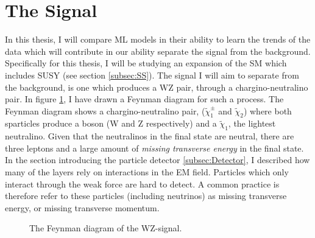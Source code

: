 \section{The Signal}\label{sec:signal}
In this thesis, I will compare \ac{ML} models in their ability to learn the trends of the data which will contribute  
in our ability separate the signal from the background. Specifically for this thesis, I will be studying an expansion of the 
\ac{SM} which includes \ac{SUSY} (see section \ref{subsec:SS}). The signal I will aim to separate from the background, is one 
which produces a WZ pair, through a chargino-neutralino pair. In figure \ref{fig:signal}, I have drawn a Feynman diagram for 
such a process. The Feynman diagram shows a chargino-neutralino pair, ($\tilde{\chi}_1^\pm$ and $\tilde{\chi}_2$)
where both sparticles produce a boson (W and Z respectively) and a $\tilde{\chi}_1$, the lightest neutralino. Given that the 
neutralinos in the final state are neutral, there are three leptons and a large amount of \emph{missing transverse energy} in the final state.
In the section introducing the particle detector \ref{subsec:Detector}, I described how many of the layers rely on interactions in 
the \ac{EM} field. Particles which only interact through the weak force are hard to detect. A common practice is therefore refer to 
these particles (including neutrinos) as missing transverse energy, or missing transverse momentum.
\begin{figure}[H]
    \centering
    \caption{The Feynman diagram of the WZ-signal.}
    \label{fig:signal}
\end{figure}